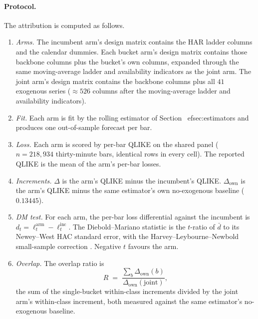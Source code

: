 \paragraph{Protocol.} The attribution is computed as follows.
\begin{enumerate}
\item \emph{Arms.} The incumbent arm's design matrix contains the HAR ladder
columns and the calendar dummies. Each bucket arm's design matrix contains
those backbone columns plus the bucket's own columns, expanded through the
same moving-average ladder and availability indicators as the joint arm. The
joint arm's design matrix contains the backbone columns plus all $41$
exogenous series ($\approx 526$ columns after the moving-average ladder and
availability indicators).
\item \emph{Fit.} Each arm is fit by the rolling estimator of
Section~
ef{sec:estimators} and produces
one out-of-sample forecast per bar.
\item \emph{Loss.} Each arm is scored by per-bar QLIKE on the shared panel
($n = 218{,}934$ thirty-minute bars, identical rows in every cell). The
reported QLIKE is the mean of the arm's per-bar losses.
\item \emph{Increments.} $\Delta$ is the arm's QLIKE minus the incumbent's
QLIKE. $\Delta_{\text{own}}$ is the arm's QLIKE minus the same estimator's
own no-exogenous baseline ($0.13445$).
\item \emph{DM test.} For each arm, the per-bar loss differential against the
incumbent is $d_t = \ell^{\text{arm}}_t - \ell^{\text{inc}}_t$. The
Diebold--Mariano statistic \citep{DieboldMariano1995} is the $t$-ratio of
$\bar{d}$ to its Newey--West HAC standard error, with the
Harvey--Leybourne--Newbold small-sample correction
\citep{HarveyLeybourneNewbold1997}. Negative $t$ favours the arm.
\item \emph{Overlap.} The overlap ratio is
\[
R \;=\; \frac{\sum_{b} \Delta_{\text{own}}(b)}{\Delta_{\text{own}}(\text{joint})},
\]
the sum of the single-bucket within-class increments divided by the joint
arm's within-class increment, both measured against the same estimator's
no-exogenous baseline.
\end{enumerate}

